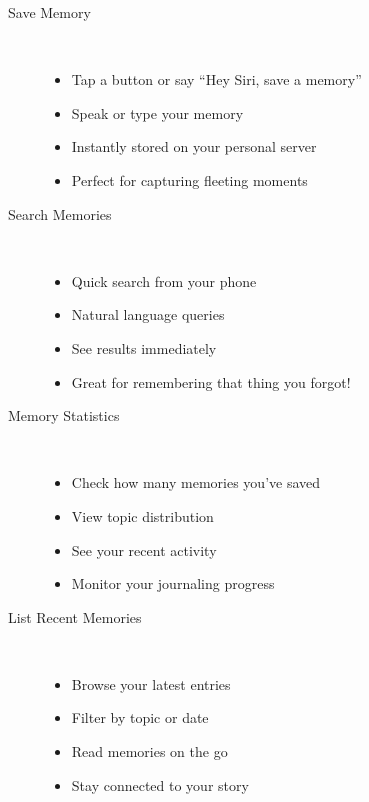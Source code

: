 \documentclass[11pt,letterpaper]{article}
\begin{document}
\begin{description}
    \item[Save Memory] ~\\
        \begin{itemize}[leftmargin=*]
            \item Tap a button or say ``Hey Siri, save a memory''
            \item Speak or type your memory
            \item Instantly stored on your personal server
            \item Perfect for capturing fleeting moments
        \end{itemize}

    \item[Search Memories] ~\\
        \begin{itemize}[leftmargin=*]
            \item Quick search from your phone
            \item Natural language queries
            \item See results immediately
            \item Great for remembering that thing you forgot!
        \end{itemize}

    \item[Memory Statistics] ~\\
        \begin{itemize}[leftmargin=*]
            \item Check how many memories you've saved
            \item View topic distribution
            \item See your recent activity
            \item Monitor your journaling progress
        \end{itemize}

    \item[List Recent Memories] ~\\
        \begin{itemize}[leftmargin=*]
            \item Browse your latest entries
            \item Filter by topic or date
            \item Read memories on the go
            \item Stay connected to your story
        \end{itemize}


\end{description}
\end{document}

